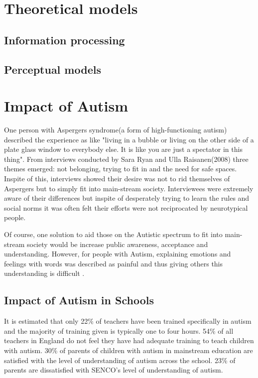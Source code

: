 \documentclass[11pt]{report}
\begin{document}
\section{Theoretical models}
\subsection{Information processing}
\subsection{Perceptual models}

\section{Impact of Autism}
One person with Aspergers syndrome(a form of high-functioning autism) described the experience as like "living in a bubble or living on the other side of a plate glass window to everybody else. It is like you are just a spectator in this thing"\cite{aspieway}. From interviews conducted by Sara Ryan and Ulla Raisanen(2008) three themes emerged: not belonging, trying to fit in and the need for safe spaces. Inspite of this, interviews showed their desire was not to rid themselves of Aspergers but to simply fit into main-stream society. Interviewees were extremely aware of their differences but inspite of desperately trying to learn the rules and social norms it was often felt their efforts were not reciprocated by neurotypical people.

Of course, one solution to aid those on the Autistic spectrum to fit into main-stream society would be increase public awareness, acceptance and understanding. However, for people with Autism, explaining emotions and feelings with words was described as painful and thus giving others this understanding is difficult \cite{aspieway}. 

\subsection{Impact of Autism in Schools}
It is estimated that only 22\% of teachers have been trained specifically in autism and the majority of training given is typically one to four hours. 54\% of all teachers in England do not feel they have had adequate training to teach children with autism.\cite{statsandfacts} 30\% of parents of children with autism in mainstream education are satisfied with the level of understanding of autism across the school\cite{nasschool}. 23\% of parents are dissatisfied with SENCO's level of understanding of autism. 
\end{document}
